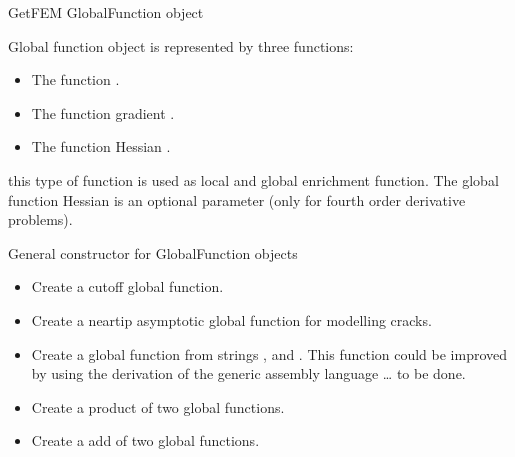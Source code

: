 \documentclass[a4paper,11pt,english]{sphinxmanual}
\begin{document}
\begin{fulllineitems}
\label{\detokenize{python/cmdref_GlobalFunction:getfem.GlobalFunction}}
GetFEM GlobalFunction object

Global function object is represented by three functions:
\begin{itemize}
\item {} 
The function .

\item {} 
The function gradient .

\item {} 
The function Hessian .

\end{itemize}

this type of function is used as local and global enrichment function. The
global function Hessian is an optional parameter (only for fourth order
derivative problems).

General constructor for GlobalFunction objects
\begin{itemize}
\item {} 
Create a cutoff global function.

\item {} 
Create a near\sphinxhyphen{}tip asymptotic global function for modelling cracks.

\item {} 
Create a global function from strings ,  and .
This function could be improved by using the derivation of the generic
assembly language … to be done.

\item {} 
Create a product of two global functions.

\item {} 
Create a add of two global functions.


\end{itemize}
\end{fulllineitems}
\end{document}
